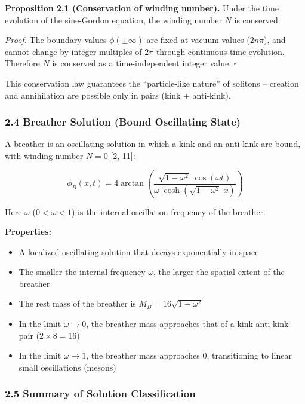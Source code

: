 \documentclass[a4paper,11pt]{article}
\providecommand{\tightlist}{\setlength{\itemsep}{0pt}\setlength{\parskip}{0pt}}
\begin{document}
\textbf{Proposition 2.1 (Conservation of winding number).} Under the
time evolution of the sine-Gordon equation, the winding number \(N\) is
conserved.

\emph{Proof.} The boundary values \(\phi(\pm\infty)\) are fixed at
vacuum values (\(2n\pi\)), and cannot change by integer multiples of
\(2\pi\) through continuous time evolution. Therefore \(N\) is conserved
as a time-independent integer value. \(\square\)

This conservation law guarantees the ``particle-like nature'' of
solitons -- creation and annihilation are possible only in pairs (kink +
anti-kink).

\subsubsection{2.4 Breather Solution (Bound Oscillating
State)}\label{breather-solution-bound-oscillating-state}

A breather is an oscillating solution in which a kink and an anti-kink
are bound, with winding number \(N = 0\) {[}2, 11{]}:

\[\phi_B(x, t) = 4\arctan\left(\frac{\sqrt{1 - \omega^2}\;\cos(\omega t)}{\omega\;\cosh\left(\sqrt{1 - \omega^2}\;x\right)}\right)\]

Here \(\omega\) (\(0 < \omega < 1\)) is the internal oscillation
frequency of the breather.

\textbf{Properties:}

\begin{itemize}
\tightlist
\item
  A localized oscillating solution that decays exponentially in space
\item
  The smaller the internal frequency \(\omega\), the larger the spatial
  extent of the breather
\item
  The rest mass of the breather is \(M_B = 16\sqrt{1 - \omega^2}\)
\item
  In the limit \(\omega \to 0\), the breather mass approaches that of a
  kink-anti-kink pair (\(2 \times 8 = 16\))
\item
  In the limit \(\omega \to 1\), the breather mass approaches \(0\),
  transitioning to linear small oscillations (mesons)
\end{itemize}

\subsubsection{2.5 Summary of Solution
Classification}\label{summary-of-solution-classification}
\end{document}
